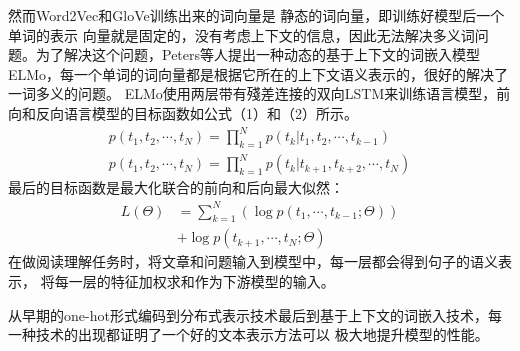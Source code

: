 然而Word2Vec和GloVe训练出来的词向量是
静态的词向量，即训练好模型后一个单词的表示
向量就是固定的，没有考虑上下文的信息，因此无法解决多义词问题。为了解决这个问题，Peters等人提出一种动态的基于上下文的词嵌入模型ELMo，每一个单词的词向量都是根据它所在的上下文语义表示的，很好的解决了一词多义的问题。
ELMo使用两层带有殘差连接的双向LSTM来训练语言模型，前向和反向语言模型的目标函数如公式（1）和（2）所示。
\begin{gather}
p(t_1,t_2,\cdots,t_N)=\prod_{k=1}^{N}p(t_k|t_1,t_2,\cdots,t_{k-1})\\
p(t_1,t_2,\cdots,t_N)=\prod_{k=1}^{N}p(t_k|t_{k+1},t_{k+2},\cdots,t_{N})
\end{gather}
最后的目标函数是最大化联合的前向和后向最大似然：
\begin{equation}
\begin{split}
L(\Theta)&=\sum_{k=1}^{N}(\log p(t_1,\cdots,t_{k-1};\Theta)) \\
&+\log p(t_{k+1},\cdots,t_N;\Theta)
\end{split}
\end{equation}
在做阅读理解任务时，将文章和问题输入到模型中，每一层都会得到句子的语义表示，
将每一层的特征加权求和作为下游模型的输入。


从早期的one-hot形式编码到分布式表示技术最后到基于上下文的词嵌入技术，每一种技术的出现都证明了一个好的文本表示方法可以
极大地提升模型的性能。
